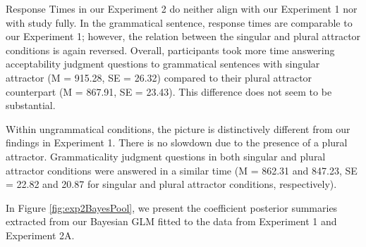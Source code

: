 Response Times in our Experiment 2 do neither align with our Experiment 1 nor with \cites{LagoEtAl2019} study fully. In the grammatical sentence, response times are comparable to our Experiment 1; however, the relation between the singular and plural attractor conditions is again reversed. Overall, participants took more time answering acceptability judgment questions to grammatical sentences with singular attractor (M = 915.28, SE = 26.32) compared to their plural attractor counterpart (M = 867.91, SE = 23.43). This difference does not seem to be substantial.

Within ungrammatical conditions, the picture is distinctively different from our findings in Experiment 1. There is no slowdown due to the presence of a plural attractor. Grammaticality judgment questions in both singular and plural attractor conditions were answered in a similar time (M = 862.31 and 847.23, SE = 22.82 and 20.87 for singular and plural attractor conditions, respectively). 

In Figure \ref{fig:exp2BayesPool}, we present the coefficient posterior summaries extracted from our Bayesian GLM fitted to the data from Experiment 1 and Experiment 2A. 



